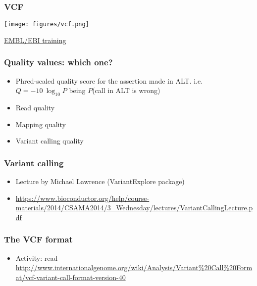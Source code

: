 \documentclass{beamer}
\begin{document}
\begin{frame}
  \frametitle{VCF}
\texttt{[image: figures/vcf.png]}

\href{https://www.ebi.ac.uk/training/online/course/human-genetic-variation-introduction/exercise-title/want-know-how-we-did-it}{EMBL/EBI training}
\end{frame}


\begin{frame}
  \frametitle{Quality values: which one?}

  \begin{itemize}
  \item Phred-scaled quality score for the assertion made in ALT. i.e. $Q = -10 \ \log_{10} P$  being $P$(call in ALT is wrong)
  \item Read quality
  \item Mapping quality
  \item Variant calling quality
  \end{itemize}
\end{frame}





\begin{frame}
  \frametitle{Variant calling}
  \begin{itemize}
  \item Lecture by Michael Lawrence (VariantExplore package)
  \item \url{https://www.bioconductor.org/help/course-materials/2014/CSAMA2014/3_Wednesday/lectures/VariantCallingLecture.pdf}
  \end{itemize}
\end{frame}



\begin{frame}
  \frametitle{The VCF format}
  \begin{itemize}
  \item Activity: read \url{http://www.internationalgenome.org/wiki/Analysis/Variant\%20Call\%20Format/vcf-variant-call-format-version-40}
  \end{itemize}
\end{frame}



\end{document}
